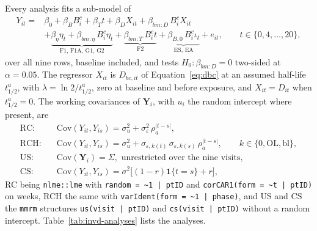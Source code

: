 \documentclass[11pt]{article}
\newcommand{\code}[1]{\texttt{#1}}
\begin{document}
Every analysis fits a sub-model of
\begin{equation}
\begin{aligned}
Y_{it} = {} & \beta_0 + \beta_B B^{c}_i + \beta_T t + \beta_D X_{it} +
  \beta_{bm:D}\, B^{c}_i X_{it} \\
& + \underbrace{\beta_\eta \eta_t + \beta_{bm:\eta}\, B^{c}_i \eta_t}_{\text{F1, F1A, G1, G2}}
  + \underbrace{\beta_{bm:T}\, B^{c}_i t}_{\text{F2}}
  + \underbrace{\beta_{B,0}\, B^{c}_i \iota_t}_{\text{ES, EA}}
  + e_{it},
\qquad t \in \{0, 4, \dots, 20\},
\end{aligned}
\label{eq:invd-mean}
\end{equation}
over all nine rows, baseline included, and tests $H_0\colon
\beta_{bm:D} = 0$ two-sided at $\alpha = 0.05$. The regressor $X_{it}$
is $D_{bc,it}$ of Equation~\eqref{eq:dbc} at an assumed half-life
$t_{1/2}^{a}$, with $\lambda = \ln 2/t_{1/2}^{a}$, zero at baseline and
before exposure, and $X_{it} = D_{it}$ when $t_{1/2}^{a} = 0$. The
working covariances of $\mathbf Y_i$, with $u_i$ the random intercept
where present, are
\begin{equation}
\begin{aligned}
\text{RC:}\quad & \mathrm{Cov}(Y_{it}, Y_{is}) = \sigma_u^2 +
  \sigma_\varepsilon^2\, \rho_a^{|t - s|}, \\
\text{RCH:}\quad & \mathrm{Cov}(Y_{it}, Y_{is}) = \sigma_u^2 +
  \sigma_{\varepsilon,k(t)}\,\sigma_{\varepsilon,k(s)}\, \rho_a^{|t - s|}, \qquad
  k \in \{0, \mathrm{OL}, \mathrm{bl}\}, \\
\text{US:}\quad & \mathrm{Cov}(\mathbf Y_i) = \Sigma, \text{ unrestricted
  over the nine visits}, \\
\text{CS:}\quad & \mathrm{Cov}(Y_{it}, Y_{is}) = \sigma^2\big[(1 -
  r)\mathbf 1\{t = s\} + r\big],
\end{aligned}
\label{eq:invd-cov}
\end{equation}
RC being \code{nlme::lme} with \code{random = \textasciitilde 1 | ptID}
and \code{corCAR1(form = \textasciitilde t | ptID)} on weeks, RCH the
same with \code{varIdent(form = \textasciitilde 1 | phase)}, and US
and CS the \code{mmrm} structures \code{us(visit | ptID)} and
\code{cs(visit | ptID)} without a random intercept.
Table~\ref{tab:invd-analyses} lists the analyses.
\end{document}
